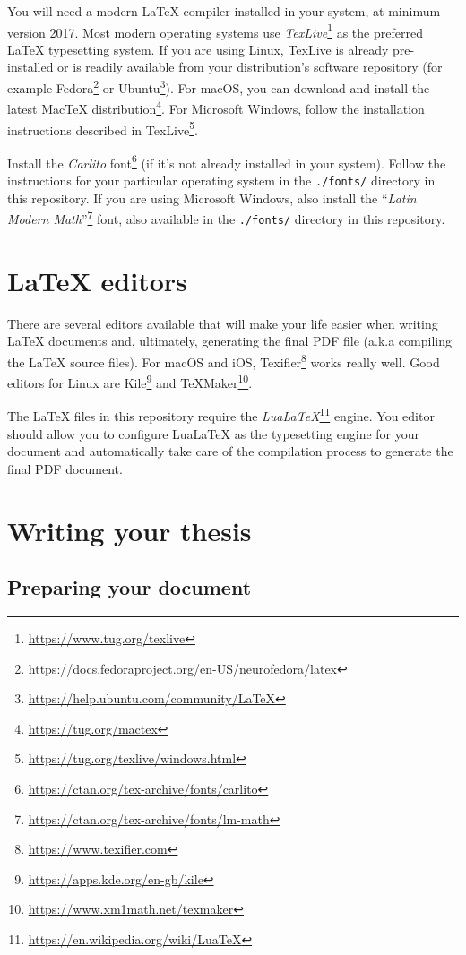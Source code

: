 You will need a modern LaTeX compiler installed in your system, at minimum version 2017. Most modern operating systems use \textit{TexLive}\footnote{\url{https://www.tug.org/texlive}} as the preferred LaTeX typesetting system. If you are using Linux, TexLive is already pre-installed or is readily available from your distribution's software repository (for example Fedora\footnote{\url{https://docs.fedoraproject.org/en-US/neurofedora/latex}} or Ubuntu\footnote{\url{https://help.ubuntu.com/community/LaTeX}}). For macOS, you can download and install the latest MacTeX distribution\footnote{\url{https://tug.org/mactex}}. For Microsoft Windows, follow the installation instructions described in TexLive\footnote{\url{https://tug.org/texlive/windows.html}}.

Install the \textit{Carlito} font\footnote{\url{https://ctan.org/tex-archive/fonts/carlito}} (if it's not already installed in your system). Follow the instructions for your particular operating system in the \verb|./fonts/| directory in this repository. If you are using Microsoft Windows, also install the ``\textit{Latin Modern Math}''\footnote{\url{https://ctan.org/tex-archive/fonts/lm-math}} font, also available in the \verb|./fonts/| directory in this repository.


\section{LaTeX editors}


There are several editors available that will make your life easier when writing LaTeX documents and, ultimately, generating the final PDF file (a.k.a compiling the LaTeX source files). For macOS and iOS, Texifier\footnote{\url{https://www.texifier.com}} works really well. Good editors for Linux are Kile\footnote{\url{https://apps.kde.org/en-gb/kile}} and TeXMaker\footnote{\url{https://www.xm1math.net/texmaker}}.

The LaTeX files in this repository require the \textit{LuaLaTeX}\footnote{\url{https://en.wikipedia.org/wiki/LuaTeX}} engine. You editor should allow you to configure LuaLaTeX as the typesetting engine for your document and automatically take care of the compilation process to generate the final PDF document.


\section{Writing your thesis}


\subsection{Preparing your document}

